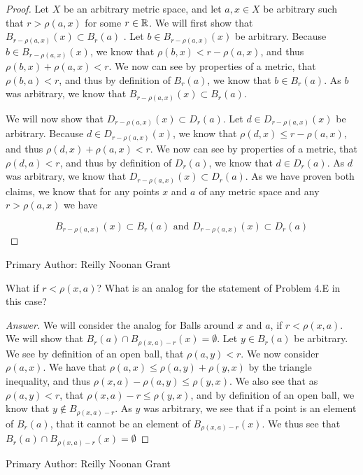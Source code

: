 \begin{proof}
  Let $X$ be an arbitrary metric space, and let $a,x\in X$ be
  arbitrary such that $r
  > \rho(a,x)$ for some $r\in \mathbb{R}$.  We will first show that 
  $B_{r-\rho(a,x)}(x) \subset B_r(a)$ . Let $b \in B_{r-\rho(a,x)}(x)$
  be arbitrary. Because $b \in B_{r-\rho(a,x)}(x)$, we know that
  $\rho(b,x) < r- \rho(a,x)$, and thus   $\rho(b,x) + \rho(a,x)<
  r$. We now can see by properties of a metric, that $\rho(b,a)<r$,
  and thus by definition of $B_r(a)$, we know that $b \in B_r(a)$. As
  $b$ was arbitrary, we know that $B_{r-\rho(a,x)}(x) \subset B_r(a)$.

  We will now show that $D_{r-\rho(a,x)}(x) \subset D_r(a)$. Let $d 
  \in D_{r-\rho(a,x)}(x)$ be arbitrary. Because $d \in D_{r-\rho(a,x)}(x)$, we know that
  $\rho(d,x) \leq r- \rho(a,x)$, and thus   $\rho(d,x) + \rho(a,x)<
  r$. We now can see by properties of a metric, that $\rho(d,a)<r$,
  and thus by definition of $D_r(a)$, we know that $d \in D_r(a)$. As
  $d$ was arbitrary, we know that $D_{r-\rho(a,x)}(x) \subset
  D_r(a)$. As we have proven both claims, we know that for any points
  $x$ and $a$ of any metric space and any $r 
  > \rho(a,x)$ we have

  $$B_{r-\rho(a,x)}(x) \subset B_r(a) \text{  and  }
  D_{r-\rho(a,x)}(x) \subset D_r(a)$$
\end{proof}
Primary Author: Reilly Noonan Grant

\begin{minorEx}%
    What if $r < \rho(x,a)$? What is an analog for the statement of Problem 4.E
    in this case?
\end{minorEx}

\begin{proof}[Answer]
  We will consider the analog for Balls around $x$ and $a$, if $r<
  \rho(x,a)$. We will show that $B_r(a) \cap B_{\rho(x,a)-r}(x) =
  \emptyset$. Let $y\in B_{r}(a)$ be arbitrary. We see by
  definition of an open ball, that $\rho(a,y) < r$. 
  We now consider $\rho(a,x)$. We have that 
  $\rho(a,x) \leq \rho(a,y) + \rho(y,x)$ by the triangle inequality,
  and thus $\rho(x,a) - \rho(a,y) \leq\rho(y,x)$. We also see that as
  $\rho(a,y) < r$, that $\rho(x,a) - r \leq\rho(y,x)$, and by
  definition of an open ball, we know that $y \notin B_{\rho(x,a)-r}$.
  As $y$ was arbitrary, we see that if a point is an element of
  $B_r(a)$, that it cannot be an element of $B_{\rho(x,a)-r}(x)$. We
  thus see that $B_r(a) \cap B_{\rho(x,a)-r}(x) = \emptyset$
\end{proof}

Primary Author: Reilly Noonan Grant
